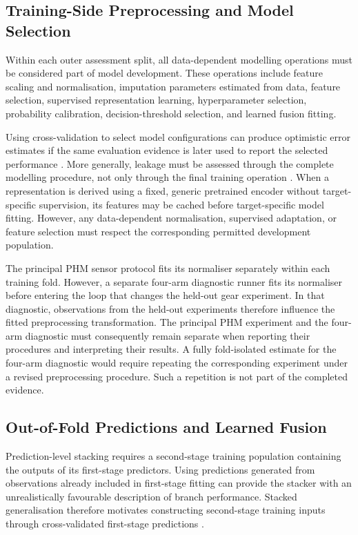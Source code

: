 \subsection{Training-Side Preprocessing and Model Selection}

Within each outer assessment split, all data-dependent modelling operations must be considered part of model development. These operations include feature scaling and normalisation, imputation parameters estimated from data, feature selection, supervised representation learning, hyperparameter selection, probability calibration, decision-threshold selection, and learned fusion fitting.

Using cross-validation to select model configurations can produce optimistic error estimates if the same evaluation evidence is later used to report the selected performance \parencite{P004}. More generally, leakage must be assessed through the complete modelling procedure, not only through the final training operation \parencite{P017}. When a representation is derived using a fixed, generic pretrained encoder without target-specific supervision, its features may be cached before target-specific model fitting. However, any data-dependent normalisation, supervised adaptation, or feature selection must respect the corresponding permitted development population.

The principal PHM sensor protocol fits its normaliser separately within each training fold. However, a separate four-arm diagnostic runner fits its normaliser before entering the loop that changes the held-out gear experiment. In that diagnostic, observations from the held-out experiments therefore influence the fitted preprocessing transformation. The principal PHM experiment and the four-arm diagnostic must consequently remain separate when reporting their procedures and interpreting their results. A fully fold-isolated estimate for the four-arm diagnostic would require repeating the corresponding experiment under a revised preprocessing procedure. Such a repetition is not part of the completed evidence.

\subsection{Out-of-Fold Predictions and Learned Fusion}

Prediction-level stacking requires a second-stage training population containing the outputs of its first-stage predictors. Using predictions generated from observations already included in first-stage fitting can provide the stacker with an unrealistically favourable description of branch performance. Stacked generalisation therefore motivates constructing second-stage training inputs through cross-validated first-stage predictions \parencite{Ting1999Issues}.

